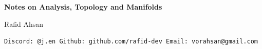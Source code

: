 



\begin{titlepage}
    \centering
    \vspace*{2cm}
    {\Huge\bfseries Notes on Analysis, Topology and Manifolds \par}
    \vspace{1.5cm}
    {\Large Rafid Ahsan\par}
    \vspace{2cm}
    \vfill
    \texttt{Discord: @j.en \quad Github: github.com/rafid-dev \quad Email: vorahsan@gmail.com}
    \vspace{1cm}
\end{titlepage}



\tableofcontents



